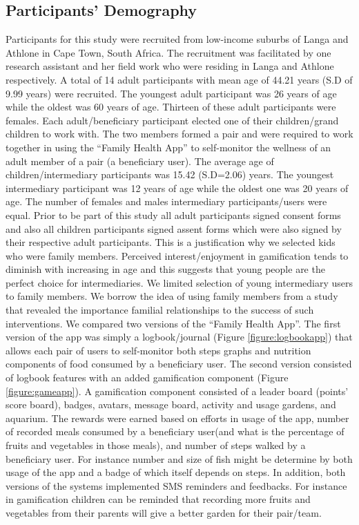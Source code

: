 \documentclass{sig-alternate}
\begin{document}
\subsection{Participants' Demography}
Participants for this study were recruited from low-income suburbs of Langa and Athlone in Cape Town, South Africa. The recruitment was facilitated by one research assistant and her field work who were residing in Langa and Athlone respectively.\newline
A total of 14 adult participants with mean age of 44.21 years (S.D of 9.99 years) were recruited. The youngest adult participant was 26 years of age while the oldest was 60 years of age. Thirteen of these adult participants were females. Each adult/beneficiary participant  elected one of their children/grand children to work with. The two members formed a pair and were required to work together in using the ``Family Health App'' to self-monitor the wellness of an adult member of a pair (a beneficiary user). The average age of children/intermediary participants was 15.42 (S.D=2.06) years. The youngest intermediary participant was 12 years of age while the oldest one was 20 years of age. The number of females and males intermediary participants/users were equal. Prior to be part of this study all adult participants signed consent forms and also all children participants signed assent forms which were also signed by their respective adult participants. This is a justification why we selected kids who were family members. Perceived interest/enjoyment in gamification tends to diminish with increasing in age \cite{v2014motivational} and this suggests that young people are the perfect choice for intermediaries. We limited selection of young intermediary users to family members. We borrow the idea of using family members from a study \cite{katule2016:leveraging} that revealed the importance familial relationships to the success of such interventions.\newline
We compared two versions of the ``Family Health App''. The first version of the app was simply a logbook/journal (Figure \ref{figure:logbookapp}) that allows each pair of users to self-monitor both steps graphs and nutrition components of food consumed by a beneficiary user. The second version consisted of logbook features with an added gamification component (Figure \ref{figure:gameapp}). A gamification component consisted of a leader board (points' score board), badges, avatars, message board, activity and usage gardens, and aquarium. The rewards were earned based on efforts in usage of the app, number of recorded meals consumed by a beneficiary user(and what is the percentage of fruits and vegetables in those meals), and number of steps walked by a beneficiary user. For instance  number and size of fish might be determine by both usage of the app and a badge of which itself depends on steps.  In addition, both versions of the systems implemented SMS reminders and feedbacks. For instance in gamification children can be reminded that recording more fruits and vegetables from their parents will give a better garden for their pair/team.\newline 
\end{document}
